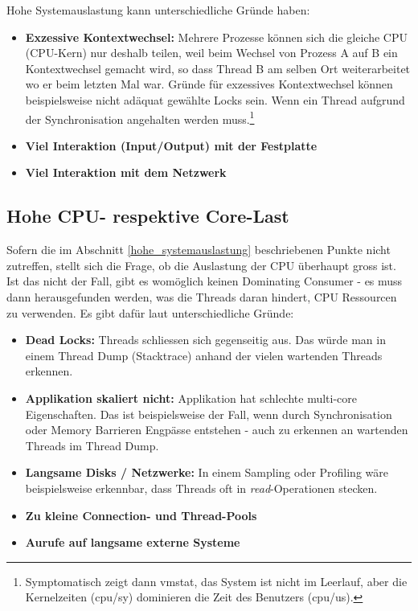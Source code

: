 Hohe Systemauslastung kann unterschiedliche Gründe haben: 
\begin{itemize}
\item \textbf{Exzessive Kontextwechsel:} Mehrere Prozesse können sich die gleiche CPU (CPU-Kern) nur deshalb teilen, weil beim Wechsel von Prozess A auf B ein Kontextwechsel gemacht wird, so dass Thread B am selben Ort weiterarbeitet wo er beim letzten Mal war. Gründe für exzessives Kontextwechsel können beispielsweise nicht adäquat gewählte Locks sein. Wenn ein Thread aufgrund der Synchronisation angehalten werden muss.\footnote{Symptomatisch zeigt dann vmstat, das System ist nicht im Leerlauf, aber die Kernelzeiten (cpu/sy) dominieren die Zeit des Benutzers (cpu/us).}
\item \textbf{Viel Interaktion (Input/Output) mit der Festplatte} 
\item \textbf{Viel Interaktion mit dem Netzwerk} 
\end{itemize}


\subsection{Hohe CPU- respektive Core-Last}
Sofern die im Abschnitt \ref{hohe_systemauslastung} beschriebenen Punkte nicht zutreffen, stellt sich die Frage, ob die Auslastung der CPU überhaupt gross ist. Ist das nicht der Fall, gibt es womöglich keinen Dominating Consumer - es muss dann herausgefunden werden, was die Threads daran hindert, CPU Ressourcen zu verwenden. Es gibt dafür laut \cite{pepperdine201102} unterschiedliche Gründe:
\begin{itemize}
\item \textbf{Dead Locks: } Threads schliessen sich gegenseitig aus. Das würde man in einem Thread Dump (Stacktrace) anhand der vielen wartenden Threads erkennen. 
\item \textbf{Applikation skaliert nicht: } Applikation hat schlechte multi-core Eigenschaften. Das ist beispielsweise der Fall, wenn durch Synchronisation oder Memory Barrieren Engpässe entstehen - auch zu erkennen an wartenden Threads im Thread Dump.
\item \textbf{Langsame Disks / Netzwerke: }In einem Sampling oder Profiling wäre beispielsweise erkennbar, dass Threads oft in \textit{read}-Operationen stecken.
\item \textbf{Zu kleine Connection- und Thread-Pools}
\item \textbf{Aurufe auf langsame externe Systeme}
\end{itemize}


